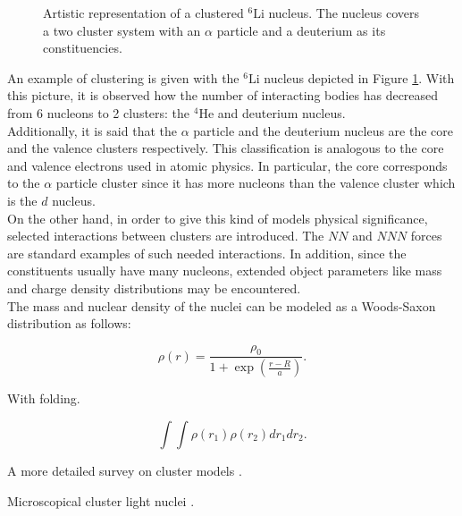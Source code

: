 \documentclass[openany]{book}
\begin{document}
\begin{figure}[H]
	
	\caption[Clustered $\mathrm{{}^{6}Li}$ nucleus]{Artistic representation of a clustered $\mathrm{{}^{6}Li}$ nucleus. The nucleus covers a two cluster system with an $\alpha$ particle and a deuterium as its constituencies.  }
	\label{fig:microscopical_cluster}
\end{figure}


An example of clustering is given with the $\mathrm{{}^{6}Li}$ nucleus depicted in Figure \ref{fig:microscopical_cluster}. With this picture, it is observed how the number of interacting bodies has decreased from 6 nucleons to 2 clusters: the  $\mathrm{{}^{4}He}$ and deuterium nucleus.  \\

Additionally, it is said that the $\alpha$ particle and the deuterium nucleus are the core and the valence clusters respectively. This classification is analogous to the core and valence electrons used in atomic physics. In particular, the core corresponds to the $\alpha$ particle cluster since it has more nucleons than the valence cluster which is the $d$ nucleus.  \\

On the other hand, in order to give this kind of models physical significance, selected interactions between clusters are introduced. The $NN$ and $NNN$ forces are standard examples of such needed interactions. In addition, since the constituents usually have many nucleons, extended object parameters like mass and charge density distributions may be encountered. \\

The mass and nuclear density of the nuclei can be modeled as a Woods-Saxon distribution as follows:

\begin{equation} \label{eq:micro_density}
	\rho(r) = \frac{\rho_0}{1 + \exp{\left(\frac{r - R}{a}\right)}}.
\end{equation} 

With folding.

\begin{equation}  \label{eq:micro_folding}
	\int \int \rho(r_1) \rho(r_2) dr_1 dr_2. 
\end{equation}


A more detailed survey on cluster models \cite{beck_2012}.

Microscopical cluster light nuclei \cite{freer_horiuchi_kanada-enyo_lee_meisner_2018}.
\end{document}
